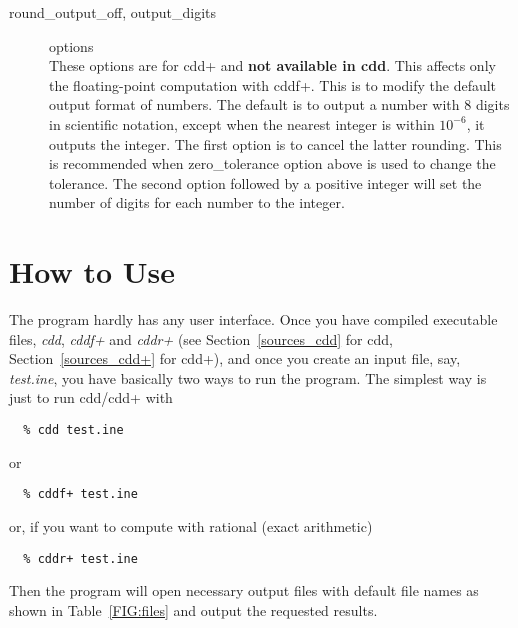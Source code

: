 \documentclass[11pt]{article}
\begin{document}
\begin{description}
\item[round\_output\_off, output\_digits] options\\
These options are for cdd+ and {\bf not available in cdd\/}.
This affects only the floating-point computation with cddf+.
This is to modify the default output format of numbers.  The default is
to output a number with 8 digits in scientific notation, except when
the nearest integer is within $10^{-6}$, it outputs the integer.
The first option is to cancel the latter rounding. This is recommended
when zero\_tolerance option above is used to change the tolerance.   
The second option followed by a positive integer will set the number of
digits for each number to the integer.  

\end{description}

\section{How to Use}  \label{HOWTO}

The program hardly has any user interface.  Once you have compiled
executable files,  {\em cdd\/},  {\em cddf+\/} and {\em cddr+\/} 
(see Section~\ref{sources_cdd} for cdd, Section~\ref{sources_cdd+} for cdd+), 
and once you create an input file,
say, {\em test.ine\/}, you have basically two ways to run the program.
The simplest way is just to run cdd/cdd+ with 
\begin{verbatim}
  % cdd test.ine
\end{verbatim}
or
\begin{verbatim}
  % cddf+ test.ine
\end{verbatim}
or, if you want to compute with rational (exact arithmetic)
\begin{verbatim}
  % cddr+ test.ine
\end{verbatim}
Then the program will open necessary output files with
default file names as shown in Table~\ref{FIG:files} 
and output the requested results.
\end{document}
